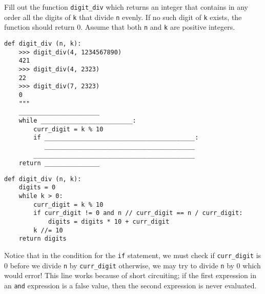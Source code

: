 \question Fill out the function \lstinline{digit_div} which returns an integer that contains in any order all the digits of \lstinline{k} that divide \lstinline{n} evenly. If no such digit of \lstinline{k} exists, the function should return 0. Assume that both \lstinline{n} and \lstinline{k} are positive integers.

\begin{blocksection}
\begin{lstlisting}
def digit_div (n, k):
    >>> digit_div(4, 1234567890)
    421
    >>> digit_div(4, 2323)
    22
    >>> digit_div(7, 2323)
    0
    """
    ______________________
    while _________________________:
        curr_digit = k % 10
        if _________________________________________:
           _________________________________________
        ____________________________________________
    return _______________
\end{lstlisting}
\end{blocksection}

\begin{blocksection}
\begin{solution}
\begin{lstlisting}
def digit_div (n, k):
    digits = 0
    while k > 0:
        curr_digit = k % 10
        if curr_digit != 0 and n // curr_digit == n / curr_digit:
            digits = digits * 10 + curr_digit
        k //= 10
    return digits
\end{lstlisting}
Notice that in the condition for the \lstinline{if} statement, we must check if \lstinline{curr_digit} is 0 before we divide \lstinline{n} by \lstinline{curr_digit} otherwise, we may try to divide \lstinline{n} by 0 which would error! This line works because of short circuiting; if the first expression in an \lstinline{and} expression is a false value, then the second expression is never evaluated.
\end{solution}
\end{blocksection}